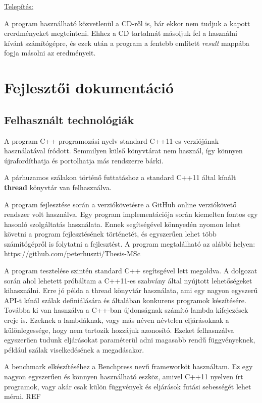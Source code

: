 \documentclass[twoside, a4paper, 12pt]{article}
\begin{document}
\noindent \underline{Telepítés:} \par
A program használható közvetlenül a CD-ről is, bár ekkor nem tudjuk a kapott ererdményeket megteinteni. Ehhez a CD tartalmát másoljuk fel a használni kívánt számítógépre, és ezek után a program a fentebb említett \textit{result} mappába fogja másolni az eredményeit.

\clearpage
\section{Fejlesztői dokumentáció}

\subsection{Felhasznált technológiák}
A program C++ programozási nyelv standard C++11-es verziójának használatával íródott. Semmilyen külső könyvtárat nem használ, így könnyen újrafordíthatja és portolhatja más rendszerre bárki. \par
A párhuzamos szálakon történő futtatáshoz a standard C++11 által kínált \textbf{thread} könyvtár van felhasználva. \par
A program fejlesztése során a verziókövetésre a GitHub online verziókövető rendszer volt használva. Egy program implementációja során kiemelten fontos egy hasonló szolgáltatás használata. Ennek segítségével könnyedén nyomon lehet követni a program fejlesztésének történetét, és egyszerűen lehet több számítógépről is folytatni a fejlesztést. A program megtalálható az alábbi helyen: https://github.com/peterhuszti/Thesis-MSc \par
A program tesztelése szintén standard C++ segítsgével lett megoldva. A dolgozat során ahol lehetett próbáltam a C++11-es szabvány által nyújtott lehetőségeket kihasználni. Erre jó példa a thread könyvtár használata, ami egy nagyon egyszerű API-t kínál szálak definiálására és általában konkurens programok készítésére. Továbba ki van hasnzálva a C++-ban újdonságnak számító lambda kifejezések ereje is. Ezeknek a lambdáknak, vagy más néven névtelen eljárásoknak a különlegessége, hogy nem tartozik hozzájuk azonosító. Ezeket felhasnzálva egyszerűen tudunk eljárásokat paraméterül adni magasabb rendű függvényeknek, például szálak viselkedésének a megadásakor. \par
A benchmark elkészítéséhez a Benchpress nevű frameworköt használtam. Ez egy nagyon egyszerűen és könnyen használható eszköz, amivel C++11 nyelven írt programok, vagy akár csak külön függvények és eljárások futási sebességét lehet mérni. REF \par
\end{document}
